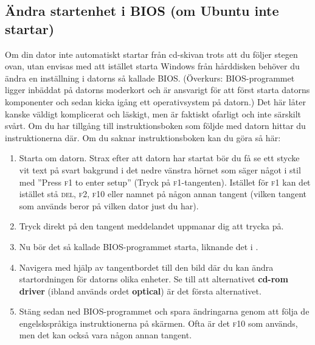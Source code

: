 \documentclass[a4paper,final]{memoir} %
\begin{document}

\subsection{Ändra startenhet i BIOS (om Ubuntu inte startar)}

Om din dator inte automatiskt startar från cd-skivan trots att du följer stegen ovan, utan envisas med att istället starta Windows från hårddisken behöver du ändra en inställning i datorns så kallade BIOS. (Överkurs: BIOS-programmet ligger inbäddat på datorns moderkort och är ansvarigt för att först starta datorns komponenter och sedan kicka igång ett operativsystem på datorn.) Det här låter kanske väldigt komplicerat och läskigt, men är faktiskt ofarligt och inte särskilt svårt. Om du har tillgång till instruktionsboken som följde med datorn hittar du instruktionerna där. Om du saknar instruktionsboken kan du göra så här:

\begin{enumerate}
\item Starta om datorn. Strax efter att datorn har startat bör du få se ett stycke vit text på svart bakgrund i det nedre vänstra hörnet som säger något i stil med ''Press \textsc{f1} to enter setup'' (Tryck på \textsc{f1}-tangenten). Istället för \textsc{f1} kan det istället stå \textsc{del}, \textsc{f2}, \textsc{f10} eller namnet på någon annan tangent (vilken tangent som används beror på vilken dator just du har).
\item Tryck direkt på den tangent meddelandet uppmanar dig att trycka på.
\item Nu bör det så kallade BIOS-programmet starta, liknande det i . 
\item Navigera med hjälp av tangentbordet till den bild där du kan ändra startordningen för datorns olika enheter. Se till att alternativet \textbf{cd-rom driver} (ibland används ordet \textbf{optical}) är det första alternativet. 
\item Stäng sedan ned BIOS-programmet och spara ändringarna genom att följa de engelskspråkiga instruktionerna på skärmen. Ofta är det \textsc{f10} som används, men det kan också vara någon annan tangent. 

\end{enumerate}

\end{document}
